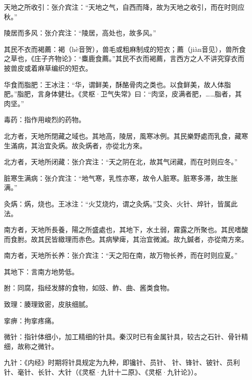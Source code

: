 \documentclass[draft,12pt]{ctexbook}
\begin{document}

\begin{jiaozhu}
	\item 天地之所收引：张介宾注：“天地之气，自西而降，故为天地之收引，而在时则应秋。”
	\item 陵居而多风：张介宾注：“陵居，高处也，故多风。”
	\item 其民不衣而褐薦：褐（hè音贺），兽毛或粗麻制成的短衣；薦（jiàn音见），兽所食之草也，《庄子齐物论》：“麋鹿食薦。”其民不衣而褐薦，言西方之人不讲究穿衣而披兽皮或着麻草编织的短衣。
	\item 华食而脂肥：王冰注：“华，谓鲜美，酥酪骨肉之类也。以食鲜美，故人体脂肥。”脂肥，言身体健壮。《灵枢·卫气失常》曰：“肉坚，皮满者肥，……脂者，其肉坚。”
	\item 毒药：指作用峻烈的药物。
\end{jiaozhu}


\begin{yuanwen}
北方者，天地所閉藏之域也。其地高，陵居，風寒冰例。其民樂野處而乳食，藏寒生滿病，其治宜灸焫。故灸焫者，亦從北方來。
\end{yuanwen}


\begin{jiaozhu}
	\item 北方者，天地所闭藏：张介宾注：“天之阴在北，故其气闭藏，而在时则应冬。”
	\item 脏寒生满病：张介宾注：“地气寒，乳性亦寒，故令人脏寒。脏寒多滞，故生胀满。”
	\item 灸焫：焫，烧也。王冰注：“火艾烧灼，谓之灸焫。”艾灸、火针、焠针，皆属此法。
\end{jiaozhu}


\begin{yuanwen}
南方者，天地所長養，陽之所盛處也，其地下，水土弱，霧露之所聚也。其民嗜酸而食胕。故其民皆緻理而赤色。其病孿痺，其治宜微滅。故九鍼者，亦從南方來。
\end{yuanwen}


\begin{jiaozhu}
	\item 南方者，天地所长养：张介宾注：“天之阳在南，故万物长养，而在时则应夏。”
	\item 其地下：言南方地势低。
	\item 胕：同腐，指经发酵的食物，如豉、鲊、曲、酱类食物。
	\item 致理：腠理致密，皮肤细腻。
	\item 挛痹：拘挛疼痛。
	\item 微针：指针体细小，加工精细的针具。秦汉时已有金属针具，较古之石针、骨针精细，故称之微针。
	\item 九针：《内经》时期将针具规定为九种，即镵针、员针、𫔂针、锋针、铍针、员利针、毫针、长针、大针（《灵枢·九针十二原》、《灵枢·九针论》）。
\end{jiaozhu}
\end{document}
